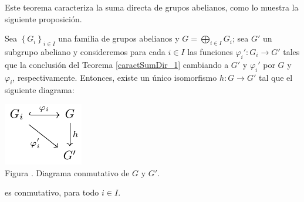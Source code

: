 \documentclass[12pt]{report}
\theoremstyle{largebreak}
\newcommand\cf[3]{\ensuremath{#1:#2\rightarrow#3}}
\newcounter{figcount}
\begin{document}
    Este teorema caracteriza la suma directa de grupos abelianos, como lo muestra la siguiente proposición.

    \begin{propo}
        \label{caractSumDir_2}
        Sea $\left\{G_i \right\}_{ i\in I}$ una familia de grupos abelianos y $G=\bigoplus_{ i\in I}G_i$; sea $G'$ un subgrupo abeliano y consideremos para cada $i\in I$ las funciones $\cf{\varphi_i'}{G_i}{G'}$ tales que la conclusión del Teorema \ref{caractSumDir_1} cambiando a $G'$  y $\varphi_i'$ por $G$ y $\varphi_i$, respectivamente. Entonces, existe un único isomorfismo $\cf{h}{G}{G'}$ tal que el siguiente diagrama:
        
        \begin{minipage}{\textwidth}
            \begin{center}
                \includegraphics[scale=1.5]{images/fig_3.pdf}\\
                Figura \thefigcount. Diagrama conmutativo de $G$ y $G'$.
            \end{center}
        \end{minipage}

        es conmutativo, para todo $i\in I$.
    \end{propo}
\end{document}
